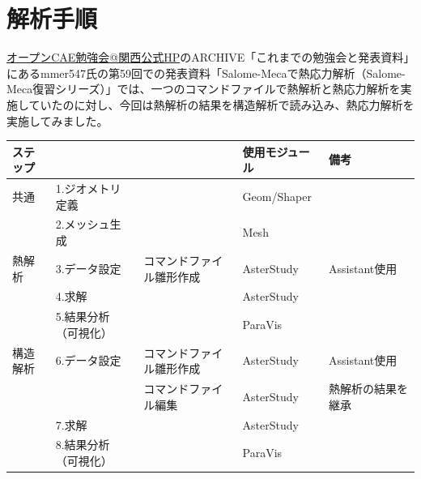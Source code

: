 \section{解析手順}
\href{https://ofbkansai.sakura.ne.jp/}{オープンCAE勉強会@関西公式HP}のARCHIVE「これまでの勉強会と発表資料」にあるmmer547氏の第59回での発表資料「Salome-Mecaで熱応力解析（Salome-Meca復習シリーズ）」では、一つのコマンドファイルで熱解析と熱応力解析を実施していたのに対し、今回は熱解析の結果を構造解析で読み込み、熱応力解析を実施してみました。
\vspace{-0.5\baselineskip}
\begin{table}[H]
	\centering
	\begin{tabular}{p{30mm}p{60mm}p{45mm}p{50mm}p{40mm}}
		\toprule
		ステップ &                      &                          & 使用モジュール & 備考               \\ \midrule
		共通     & 1.ジオメトリ定義     &                          & Geom/Shaper    &                    \\ \cline{2-5}
		         & 2.メッシュ生成       &                          & Mesh           &                    \\ \midrule
		熱解析   & 3.データ設定         & コマンドファイル雛形作成 & AsterStudy     & Assistant使用      \\ \cline{2-5}
		         & 4.求解               &                          & AsterStudy     &                    \\ \cline{2-5}
		         & 5.結果分析（可視化） &                          & ParaVis        &                    \\ \midrule
		構造解析 & 6.データ設定         & コマンドファイル雛形作成 & AsterStudy     & Assistant使用      \\ \cline{3-5}
		         &                      & コマンドファイル編集     & AsterStudy     & 熱解析の結果を継承 \\ \cline{2-5}
		         & 7.求解               &                          & AsterStudy     &                    \\ \cline{2-5}
		         & 8.結果分析（可視化） &                          & ParaVis        &                    \\ \midrule
	\end{tabular}
\end{table}

